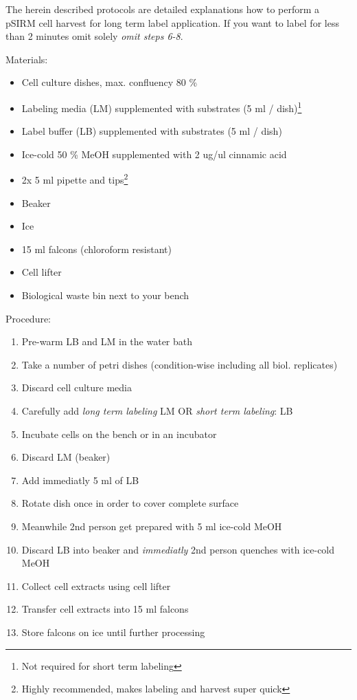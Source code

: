 \documentclass[]{book}
\providecommand{\tightlist}{%
  \setlength{\itemsep}{0pt}\setlength{\parskip}{0pt}}
\let\rmarkdownfootnote\footnote%
\def\footnote{\protect\rmarkdownfootnote}
\begin{document}
The herein described protocols are detailed explanations how to perform
a pSIRM cell harvest for long term label application. If you want to
label for less than 2 minutes omit solely \emph{omit steps 6-8}.

Materials:

\begin{itemize}
\tightlist
\item
  Cell culture dishes, max. confluency 80 \%
\item
  Labeling media (LM) supplemented with substrates (5 ml /
  dish)\footnote{Not required for short term labeling}
\item
  Label buffer (LB) supplemented with substrates (5 ml / dish)
\item
  Ice-cold 50 \% MeOH supplemented with 2 ug/ul cinnamic acid
\item
  2x 5 ml pipette and tips\footnote{Highly recommended, makes labeling
    and harvest super quick}
\item
  Beaker
\item
  Ice
\item
  15 ml falcons (chloroform resistant)
\item
  Cell lifter
\item
  Biological waste bin next to your bench
\end{itemize}

Procedure:

\begin{enumerate}
\def\labelenumi{\arabic{enumi}.}
\tightlist
\item
  Pre-warm LB and LM in the water bath
\item
  Take a number of petri dishes (condition-wise including all biol.
  replicates)
\item
  Discard cell culture media
\item
  Carefully add \emph{long term labeling} LM OR \emph{short term
  labeling}: LB
\item
  Incubate cells on the bench or in an incubator
\item
  Discard LM (beaker)
\item
  Add immediatly 5 ml of LB
\item
  Rotate dish once in order to cover complete surface
\item
  Meanwhile 2nd person get prepared with 5 ml ice-cold MeOH
\item
  Discard LB into beaker and \emph{immediatly} 2nd person quenches with
  ice-cold MeOH
\item
  Collect cell extracts using cell lifter
\item
  Transfer cell extracts into 15 ml falcons
\item
  Store falcons on ice until further processing
\end{enumerate}
\end{document}
